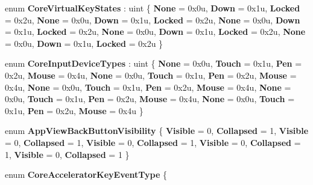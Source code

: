 \begin{DoxyCompactItemize}
enum {\bfseries Core\+Virtual\+Key\+States} \+: uint \{ \newline
{\bfseries None} = 0x0u, 
{\bfseries Down} = 0x1u, 
{\bfseries Locked} = 0x2u, 
{\bfseries None} = 0x0u, 
\newline
{\bfseries Down} = 0x1u, 
{\bfseries Locked} = 0x2u, 
{\bfseries None} = 0x0u, 
{\bfseries Down} = 0x1u, 
\newline
{\bfseries Locked} = 0x2u, 
{\bfseries None} = 0x0u, 
{\bfseries Down} = 0x1u, 
{\bfseries Locked} = 0x2u, 
\newline
{\bfseries None} = 0x0u, 
{\bfseries Down} = 0x1u, 
{\bfseries Locked} = 0x2u
 \}
\item 
\mbox{\label{namespace_windows_1_1_u_i_1_1_core_a77ab8ebe40609e15ad86f2c13a357af6}} 
enum {\bfseries Core\+Input\+Device\+Types} \+: uint \{ \newline
{\bfseries None} = 0x0u, 
{\bfseries Touch} = 0x1u, 
{\bfseries Pen} = 0x2u, 
{\bfseries Mouse} = 0x4u, 
\newline
{\bfseries None} = 0x0u, 
{\bfseries Touch} = 0x1u, 
{\bfseries Pen} = 0x2u, 
{\bfseries Mouse} = 0x4u, 
\newline
{\bfseries None} = 0x0u, 
{\bfseries Touch} = 0x1u, 
{\bfseries Pen} = 0x2u, 
{\bfseries Mouse} = 0x4u, 
\newline
{\bfseries None} = 0x0u, 
{\bfseries Touch} = 0x1u, 
{\bfseries Pen} = 0x2u, 
{\bfseries Mouse} = 0x4u, 
\newline
{\bfseries None} = 0x0u, 
{\bfseries Touch} = 0x1u, 
{\bfseries Pen} = 0x2u, 
{\bfseries Mouse} = 0x4u
 \}
\item 
\mbox{\label{namespace_windows_1_1_u_i_1_1_core_a8126ec99b9eece4bc7dfad594e5fa9a6}} 
enum {\bfseries App\+View\+Back\+Button\+Visibility} \{ \newline
{\bfseries Visible} = 0, 
{\bfseries Collapsed} = 1, 
{\bfseries Visible} = 0, 
{\bfseries Collapsed} = 1, 
\newline
{\bfseries Visible} = 0, 
{\bfseries Collapsed} = 1, 
{\bfseries Visible} = 0, 
{\bfseries Collapsed} = 1, 
\newline
{\bfseries Visible} = 0, 
{\bfseries Collapsed} = 1
 \}
\item 
\mbox{\label{namespace_windows_1_1_u_i_1_1_core_a3b4a4c6a338426f7356d6fbe21e0541e}} 
enum {\bfseries Core\+Accelerator\+Key\+Event\+Type} \{ \newline

\end{DoxyCompactItemize}
